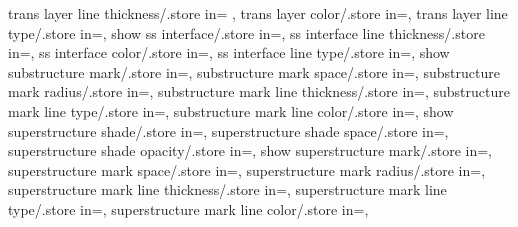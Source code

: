 {  trans layer line thickness/.store in= \translayerlinet,
  trans layer color/.store in=\translayercolor,
  trans layer line type/.store in=\translayerlinetype,
  show ss interface/.store in=\showssinter,
  ss interface line thickness/.store in=\ssinterlinet,
  ss interface color/.store in=\ssintercolor,
  ss interface line type/.store in=\ssinterlinetype,
  show substructure mark/.store in=\showmarkss,
  substructure mark space/.store in=\markssexspace,
  substructure mark radius/.store in=\markssrad,
  substructure mark line thickness/.store in=\marksslinet,
  substructure mark line type/.store in=\marksslinetype,
  substructure mark line color/.store in=\marksslinecolor,
  show superstructure shade/.store in=\showsupershade,
  superstructure shade space/.store in=\supershadespace,
  superstructure shade opacity/.store in=\supershadeopacity,
  show superstructure mark/.store in=\showmarksuper,
  superstructure mark space/.store in=\marksuperexspace,
  superstructure mark radius/.store in=\marksuperrad,
  superstructure mark line thickness/.store in=\marksuperlinet,
  superstructure mark line type/.store in=\marksuperlinetype,
  superstructure mark line color/.store in=\marksuperlinecolor,
}

